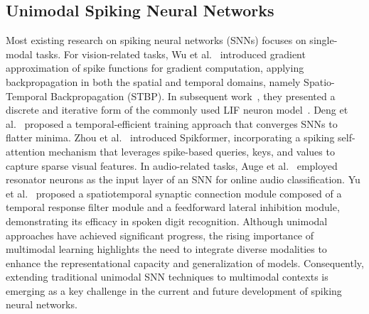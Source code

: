 \subsection{Unimodal Spiking Neural Networks}


Most existing research on spiking neural networks (SNNs) focuses on single-modal tasks. 
For vision-related tasks, Wu et al.~\cite{wu2018spatio} introduced gradient approximation of spike functions for gradient computation, applying backpropagation in both the spatial and temporal domains, namely Spatio-Temporal Backpropagation (STBP). In subsequent work~\cite{wu2019direct}, they presented a discrete and iterative form of the commonly used LIF neuron model~\cite{dayan2005theoretical}. Deng et al.~\cite{deng2022temporal} proposed a temporal-efficient training approach that converges SNNs to flatter minima. Zhou et al.~\cite{zhou2022spikformer} introduced Spikformer, incorporating a spiking self-attention mechanism that leverages spike-based queries, keys, and values to capture sparse visual features.
In audio-related tasks, Auge et al.~\cite{auge2021end} employed resonator neurons as the input layer of an SNN for online audio classification. Yu et al.~\cite{yu2022stsc} proposed a spatiotemporal synaptic connection module composed of a temporal response filter module and a feedforward lateral inhibition module, demonstrating its efficacy in spoken digit recognition.
Although unimodal approaches have achieved significant progress, the rising importance of multimodal learning highlights the need to integrate diverse modalities to enhance the representational capacity and generalization of models. Consequently, extending traditional unimodal SNN techniques to multimodal contexts is emerging as a key challenge in the current and future development of spiking neural networks.

